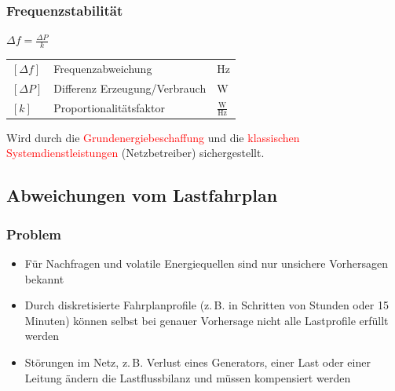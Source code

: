 \subsubsection{Frequenzstabilität}
    \begin{minipage}[t]{0.35\columnwidth}
        \centering \vspace{-0.7\baselineskip}
        $\boxed{\Delta f = \frac{\Delta P}{k}}$
    \end{minipage}%
    \hfill
    \begin{minipage}[t]{0.64\columnwidth}
        \centering \vspace{-0.7\baselineskip}
        \renewcommand{\arraystretch}{1.2}
        \begin{tabular}{@{} l p{4cm} l @{}}
            $[\Delta f]$ & Frequenzabweichung \dotfill            & $\text{Hz}$ \\
            $[\Delta P]$ & Differenz Erzeugung/Verbrauch \dotfill & $\text{W}$ \\
            $[k]$        & Proportionalitätsfaktor \dotfill & $\frac{\text{W}}{\text{Hz}}$ \\
        \end{tabular}
    \end{minipage}

    Wird durch die \textcolor{red}{Grundenergiebeschaffung} und die \textcolor{red}{klassischen Systemdienstleistungen} (Netzbetreiber) sichergestellt.

\subsection{Abweichungen vom Lastfahrplan}
\subsubsection{Problem}
    \begin{itemize}
        \item Für Nachfragen und volatile Energiequellen sind nur unsichere Vorhersagen bekannt
        \item Durch diskretisierte Fahrplanprofile (z.\,B. in Schritten von Stunden oder 15 Minuten) können selbst bei genauer Vorhersage nicht alle Lastprofile erfüllt werden
        \item Störungen im Netz, z.\,B. Verlust eines Generators, einer Last oder einer Leitung ändern die Lastflussbilanz und müssen kompensiert werden
    \end{itemize}

